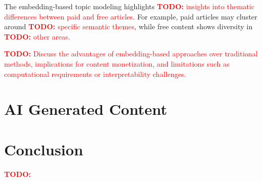 \documentclass[11pt,a4paper]{article}
\newcommand{\todo}[1]{\textcolor{red}{\textbf{TODO:} #1}}
\begin{document}
The embedding-based topic modeling highlights \todo{insights into thematic differences between paid and free articles}. For example, paid articles may cluster around \todo{specific semantic themes}, while free content shows diversity in \todo{other areas}.

\todo{Discuss the advantages of embedding-based approaches over traditional methods, implications for content monetization, and limitations such as computational requirements or interpretability challenges.}

\section{AI Generated Content}

\section{Conclusion}

\todo{}



\end{document}
